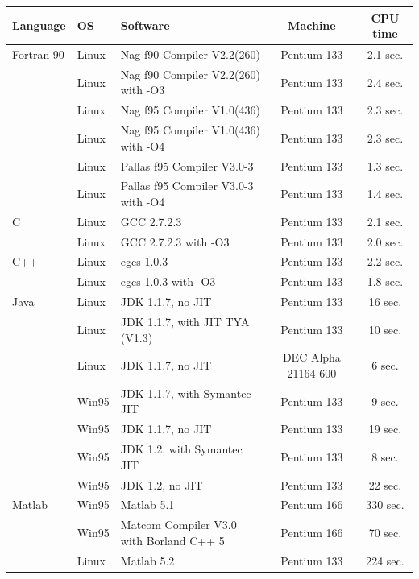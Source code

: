 \begin{table}[htbp]
  \begin{center}
    \leavevmode
    \begin{tabular}{llp{3cm}|c|c}
      Language & OS & Software & Machine & CPU time \\\hline\hline  
   Fortran 90 & Linux & Nag f90 Compiler V2.2(260) & Pentium 133 & 2.1 sec.\\
           & Linux & Nag f90 Compiler V2.2(260) with -O3 & Pentium 133 & 2.4 sec.\\
           & Linux & Nag f95 Compiler V1.0(436) & Pentium 133 & 2.3 sec.\\
           & Linux & Nag f95 Compiler V1.0(436) with -O4& Pentium 133 & 2.3 sec.\\
\rowcolor{tabgray} & Linux & Pallas f95 Compiler V3.0-3 & Pentium 133 & 1.3 sec.\\
           & Linux & Pallas f95 Compiler V3.0-3 with -O4& Pentium 133 & 1.4 sec.\\\hline
   C       & Linux & GCC 2.7.2.3 & Pentium 133 & 2.1 sec. \\
\rowcolor{tabgray} & Linux & GCC 2.7.2.3 with -O3 & Pentium 133 & 2.0 sec. \\\hline
   C++     & Linux & egcs-1.0.3 & Pentium 133 & 2.2 sec. \\
           & Linux & egcs-1.0.3 with -O3 & Pentium 133 & 1.8 sec. \\\hline
      Java & Linux & JDK 1.1.7, no JIT & Pentium 133 & 16 sec. \\
\rowcolor{tabgray} & Linux & JDK 1.1.7, with JIT TYA (V1.3) & Pentium 133 & 10 sec.\\
           & Linux & JDK 1.1.7, no JIT & DEC Alpha 21164 600 & 6 sec. \\
           & Win95 & JDK 1.1.7, with Symantec JIT & Pentium 133 & 9 sec. \\
           & Win95 & JDK 1.1.7, no JIT & Pentium 133 & 19 sec. \\
\rowcolor{tabgray} & Win95 & JDK 1.2, with Symantec JIT & Pentium 133 & 8 sec. \\
           & Win95 & JDK 1.2, no JIT & Pentium 133 & 22 sec. \\\hline
   Matlab  & Win95 & Matlab 5.1 & Pentium 166 & 330 sec.\\
\rowcolor{tabgray} & Win95 & Matcom Compiler V3.0 with Borland C++ 5 & Pentium 166 & 70 sec.\\
           & Linux & Matlab 5.2 & Pentium 133 &  224 sec.\\\hline

\end{tabular}
\end{center}
\end{table}
